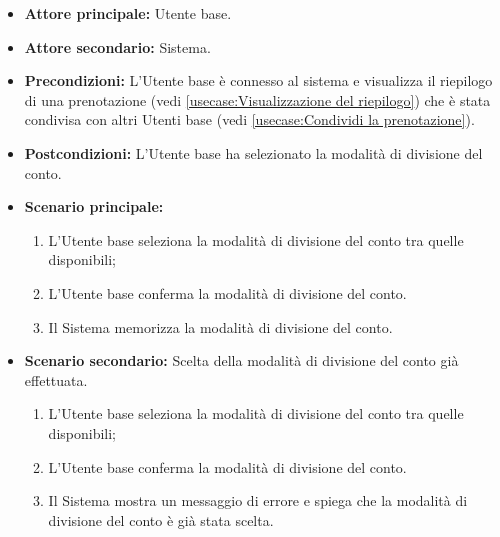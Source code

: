 \label{usecase:Selezione della modalità di divisione del conto}
\begin{itemize}
	\item \textbf{Attore principale:} Utente base.

	\item \textbf{Attore secondario:} Sistema.

	\item \textbf{Precondizioni:}
	      L'Utente base è connesso al sistema e visualizza il riepilogo di una
	      prenotazione (vedi \autoref{usecase:Visualizzazione del riepilogo})
	      che è stata condivisa con altri Utenti base (vedi
	      \autoref{usecase:Condividi la prenotazione}).

	\item \textbf{Postcondizioni:}
	      L'Utente base ha selezionato la modalità di divisione del conto.
	\item \textbf{Scenario principale:}
	      \begin{enumerate}
		      \item L'Utente base seleziona la modalità di divisione del conto
		            tra quelle disponibili;

		      \item L'Utente base conferma la modalità di divisione del conto.

		      \item Il Sistema memorizza la modalità di divisione del conto.
	      \end{enumerate}

	\item \textbf{Scenario secondario:}
	      Scelta della modalità di divisione del conto già effettuata.
	      \begin{enumerate}
		      \item L'Utente base seleziona la modalità di divisione del conto
		            tra quelle disponibili;

		      \item L'Utente base conferma la modalità di divisione del conto.

		      \item Il Sistema mostra un messaggio di errore e spiega che la
		            modalità di divisione del conto è già stata scelta.
	      \end{enumerate}
\end{itemize}

